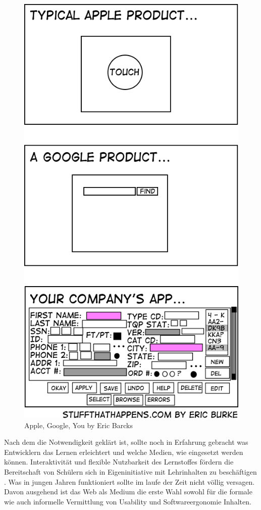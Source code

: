 \documentclass[a4paper, 12pt, twoside, BCOR=20mm, DIV=calc, abstracton, parskip=half*, toc=bibliography, toc=listof, headsepline, footsepline, headings=small, numbers=enddot]{scrreprt}
\begin{document}
\begin{figure}[h!]
\centering
\includegraphics[scale=0.7]{Bild/Usability_Comic.jpg}
\caption{Apple, Google, You by Eric Barcks}
\end{figure}
Nach dem die Notwendigkeit geklärt ist, sollte noch in Erfahrung gebracht was Entwicklern das Lernen erleichtert und welche Medien, wie eingesetzt werden können. 
Interaktivität und flexible Nutzbarkeit des Lernstoffes fördern die Bereitschaft von Schülern sich in  Eigeninitiative mit Lehrinhalten zu beschäftigen \cite[S.32 ff.]{beck2000eigenstandiges}. Was in jungen Jahren funktioniert sollte im laufe der Zeit nicht völlig versagen. Davon ausgehend ist das Web als Medium die erste Wahl sowohl für die formale wie auch informelle Vermittlung von Usability und Softwareergonomie Inhalten. 
\end{document}
